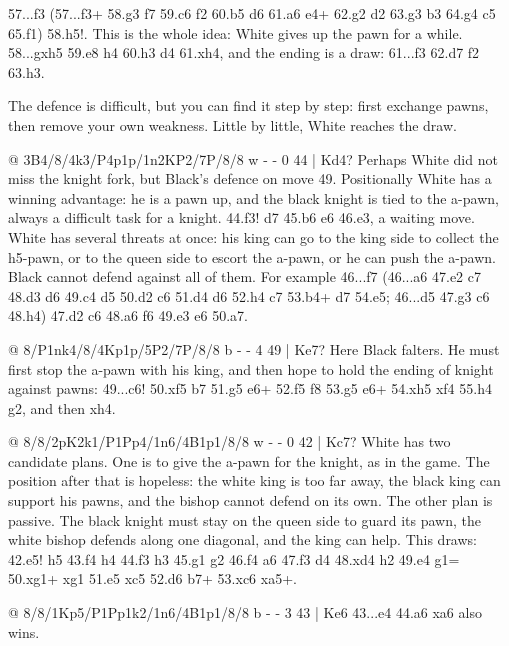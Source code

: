 57...\N f3 (57...f3+ 58.\K g3 \N f7 59.\B c6 f2 60.\B b5 \N d6 61.\B a6 \N e4+ 62.\K g2 \N d2
63.\K g3 \N b3 64.\K g4 \N c5 65.\B f1) 58.h5!. This is the whole idea: White gives up the pawn for
a while. 58...gxh5 59.\B e8 h4 60.\K h3 \N d4 61.\K xh4, and the ending is a draw: 61...f3 62.\B d7
f2 63.\B h3.

The defence is difficult, but you can find it step by step: first exchange pawns, then remove your
own weakness. Little by little, White reaches the draw.

@ 3B4/8/4k3/P4p1p/1n2KP2/7P/8/8 w - - 0 44 | Kd4?
Perhaps White did not miss the knight fork, but Black's defence on move 49. Positionally White has a
winning advantage: he is a pawn up, and the black knight is tied to the a-pawn, always a difficult
task for a knight. 44.\K f3! \K d7 45.\B b6 \K e6 46.\B e3,
a waiting move. White has several threats at once: his
king can go to the king side to collect the h5-pawn, or to the queen side to escort the a-pawn, or
he can push the a-pawn. Black cannot defend against all of them. For example 46...\K f7 (46...\N a6
47.\K e2 \N c7 48.\K d3 \K d6 49.\K c4 \N d5 50.\B d2 \K c6 51.\K d4 \K d6 52.h4 \N c7 53.\B b4+
\K d7 54.\K e5; 46...\K d5 47.\K g3 \K c6 48.\K h4) 47.\B d2 \N c6 48.a6 \K f6 49.\B e3 \K e6
50.a7.

@ 8/P1nk4/8/4Kp1p/5P2/7P/8/8 b - - 4 49 | Ke7?
Here Black falters. He must first stop the a-pawn with his king, and then hope to hold the ending
of knight against pawns: 49...\K c6! 50.\K xf5 \K b7 51.\K g5 \N e6+ 52.\K f5 \N f8 53.\K g5 \N e6+
54.\K xh5 \N xf4 55.h4 \N g2, and then \N xh4.

@ 8/8/2pK2k1/P1Pp4/1n6/4B1p1/8/8 w - - 0 42 | Kc7?
White has two candidate plans. One is to give the a-pawn for the knight, as in the game. The
position after that is hopeless: the white king is too far away, the black king can support his
pawns, and the bishop cannot defend on its own. The other plan is passive. The black knight must
stay on the queen side to guard its pawn, the white bishop defends along one
diagonal, and the king can help. This draws: 42.\K e5!
\K h5 43.\K f4 \K h4 44.\K f3 \K h3 45.\B g1 g2 46.\K f4 \N a6 47.\K f3 d4 48.\B xd4 \K h2 49.\K e4
g1=\Q{} 50.\B xg1+ \K xg1 51.\K e5 \N xc5 52.\K d6 \N b7+ 53.\K xc6 \N xa5+.

@ 8/8/1Kp5/P1Pp1k2/1n6/4B1p1/8/8 b - - 3 43 | Ke6
43...\K e4 44.a6 \N xa6 also wins.

